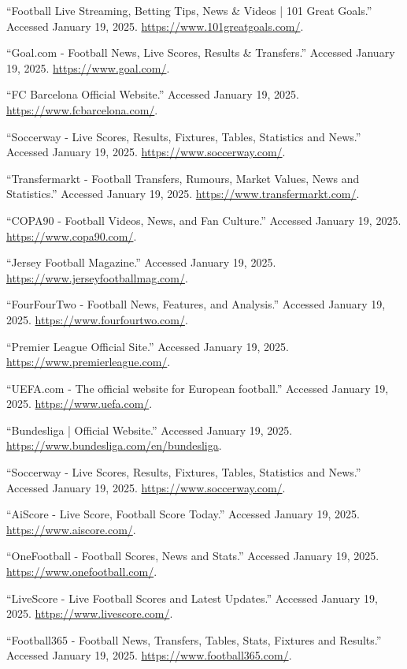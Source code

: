\documentclass{report}
\begin{document}

\begin{thebibliography}{24}
``Football Live Streaming, Betting Tips, News \& Videos | 101 Great Goals.'' Accessed January 19, 2025. \url{https://www.101greatgoals.com/}.

``Goal.com - Football News, Live Scores, Results \& Transfers.'' Accessed January 19, 2025. \url{https://www.goal.com/}.

``FC Barcelona Official Website.'' Accessed January 19, 2025. \url{https://www.fcbarcelona.com/}.

``Soccerway - Live Scores, Results, Fixtures, Tables, Statistics and News.'' Accessed January 19, 2025. \url{https://www.soccerway.com/}.

``Transfermarkt - Football Transfers, Rumours, Market Values, News and Statistics.'' Accessed January 19, 2025. \url{https://www.transfermarkt.com/}.

``COPA90 - Football Videos, News, and Fan Culture.'' Accessed January 19, 2025. \url{https://www.copa90.com/}.

``Jersey Football Magazine.'' Accessed January 19, 2025. \url{https://www.jerseyfootballmag.com/}.

``FourFourTwo - Football News, Features, and Analysis.'' Accessed January 19, 2025. \url{https://www.fourfourtwo.com/}.

``Premier League Official Site.'' Accessed January 19, 2025. \url{https://www.premierleague.com/}.

``UEFA.com - The official website for European football.'' Accessed January 19, 2025. \url{https://www.uefa.com/}.

``Bundesliga | Official Website.'' Accessed January 19, 2025. \url{https://www.bundesliga.com/en/bundesliga}.

``Soccerway - Live Scores, Results, Fixtures, Tables, Statistics and News.'' Accessed January 19, 2025. \url{https://www.soccerway.com/}.

``AiScore - Live Score, Football Score Today.'' Accessed January 19, 2025. \url{https://www.aiscore.com/}.

``OneFootball - Football Scores, News and Stats.'' Accessed January 19, 2025. \url{https://www.onefootball.com/}.

``LiveScore - Live Football Scores and Latest Updates.'' Accessed January 19, 2025. \url{https://www.livescore.com/}.

``Football365 - Football News, Transfers, Tables, Stats, Fixtures and Results.'' Accessed January 19, 2025. \url{https://www.football365.com/}.
\end{thebibliography}
\end{document}
